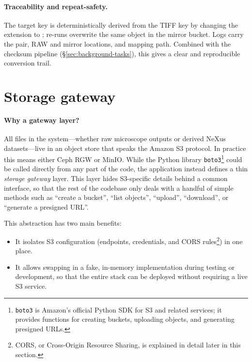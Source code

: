 \paragraph{Traceability and repeat-safety.}
The target key is deterministically derived from the TIFF key by changing the extension to ; re-runs overwrite the same object in the mirror bucket. Logs carry the pair, RAW and mirror locations, and mapping path. Combined with the checksum pipeline (\S\ref{sec:background-tasks}), this gives a clear and reproducible conversion trail.


\section{Storage gateway}\label{sec:storage-gateway}

\paragraph{Why a gateway layer?}
All files in the system---whether raw microscope outputs or derived NeXus datasets---live in an object store that speaks the Amazon S3 protocol. 
In practice this means either Ceph RGW or MinIO. 
While the Python library \texttt{boto3}\footnote{%
	\texttt{boto3} is Amazon’s official Python SDK for S3 and related services; 
	it provides functions for creating buckets, uploading objects, and generating presigned URLs.} 
could be called directly from any part of the code, the application instead defines a thin \emph{storage gateway} layer. 
This layer hides S3-specific details behind a common interface, 
so that the rest of the codebase only deals with a handful of simple methods 
such as ``create a bucket'', ``list objects'', ``upload'', ``download'', 
or ``generate a presigned URL''.

This abstraction has two main benefits:  
\begin{itemize}
	\item It isolates S3 configuration (endpoints, credentials, and CORS rules\footnote{%
		CORS, or Cross-Origin Resource Sharing, is explained in detail later in this section.}) in one place.  
	\item It allows swapping in a fake, in-memory implementation during testing or development, 
	so that the entire stack can be deployed without requiring a live S3 service.  
\end{itemize}

